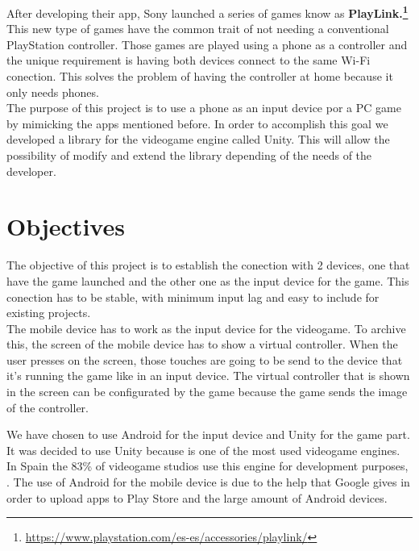 After developing their app, Sony launched a series of games know as  \textbf{PlayLink.\footnote{\url{https://www.playstation.com/es-es/accessories/playlink/}}} This new type of games have the common trait of not needing a conventional PlayStation controller. Those games are played using a phone as a controller and the unique requirement is having both devices connect to the same Wi-Fi conection. This solves the problem of having the controller at home because it only needs phones.\\

The purpose of this project is to use a phone as an input device por a PC game by mimicking the apps mentioned before. In order to accomplish this goal we developed a library for the videogame engine called Unity. This will allow the possibility of modify and extend the library depending of the needs of the developer.\\


\section*{Objectives}

The objective of this project is to establish the conection with 2 devices, one that have the game launched and the other one as the input device for the game. This conection has to be stable, with minimum input lag and easy to include for existing projects.\\

The mobile device has to work as the input device for the videogame. To archive this, the screen of the mobile device has to show a virtual controller. When the user presses on the screen, those touches are going to be send to the device that it's running the game like in an input device. The virtual controller that is shown in the screen can be configurated by the game because the game sends the image of the controller.\\


We have chosen to use Android for the input device and Unity for the game part. It was decided to use Unity because is one of the most used videogame engines. In Spain the 83\% of videogame studios use this engine for development purposes, . The use of Android for the mobile device is due to the help that Google gives in order to upload apps to Play Store and the large amount of Android devices.\\

